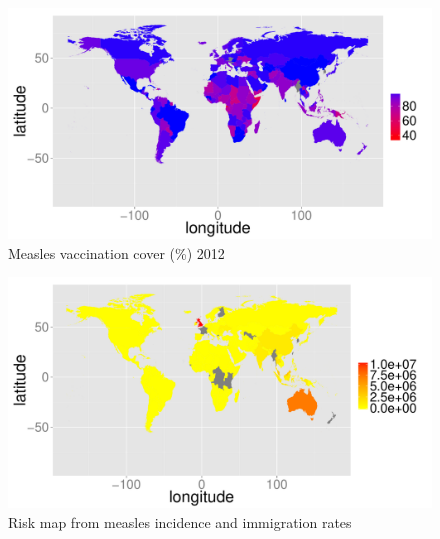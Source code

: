\documentclass{article}
\begin{document}
\begin{figure}[h!]
\begin{center}
\includegraphics{interimreport1-009}
\end{center}
\caption{Measles vaccination cover (\%) 2012 }
\end{figure}

\begin{figure}[h!]
\begin{center}
\includegraphics{interimreport1-010}
\end{center}
\caption{Risk map from measles incidence and immigration rates}
\end{figure}
\end{document}
